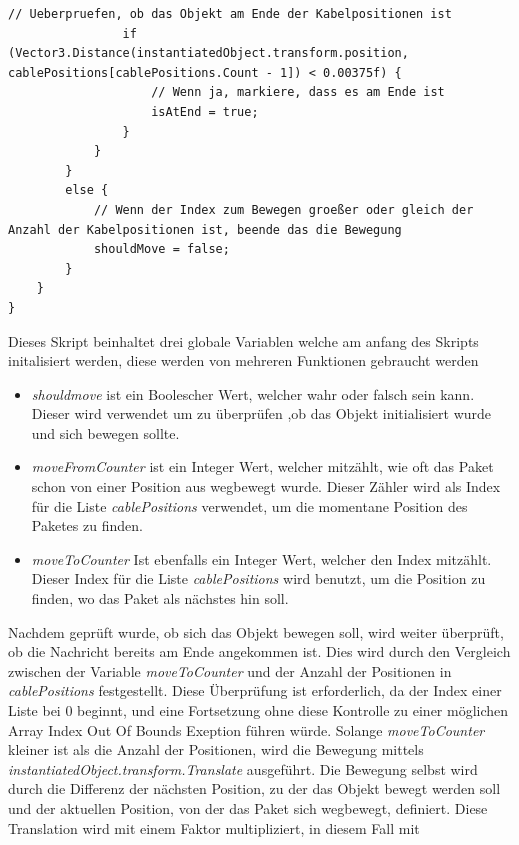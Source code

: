 \begin{itemize}
\begin{lstlisting}[style=csharp, caption={Update Funktion}, label=code:Update]
                // Ueberpruefen, ob das Objekt am Ende der Kabelpositionen ist
                if (Vector3.Distance(instantiatedObject.transform.position, cablePositions[cablePositions.Count - 1]) < 0.00375f) {
                    // Wenn ja, markiere, dass es am Ende ist
                    isAtEnd = true;
                }
            }
        }
        else {
            // Wenn der Index zum Bewegen groeßer oder gleich der Anzahl der Kabelpositionen ist, beende das die Bewegung
            shouldMove = false;
        }
    }
}

    \end{lstlisting}
    Dieses Skript beinhaltet drei globale Variablen welche am anfang des Skripts initalisiert werden, diese werden von mehreren Funktionen gebraucht werden
    \begin{itemize}
        \item \textit{shouldmove} ist ein Boolescher Wert, welcher wahr oder falsch sein kann. Dieser wird verwendet um zu überprüfen ,ob das Objekt initialisiert wurde und sich bewegen sollte.
        \item \textit{moveFromCounter} ist ein Integer Wert, welcher mitzählt, wie oft das Paket schon von einer Position aus wegbewegt wurde. Dieser Zähler wird als Index für die Liste \textit{cablePositions} verwendet, um die momentane Position des Paketes zu finden.
        \item \textit{moveToCounter} Ist ebenfalls ein Integer Wert, welcher den Index mitzählt. Dieser Index für die Liste \textit{cablePositions} wird benutzt, um die Position zu finden, wo das Paket als nächstes hin soll.
    \end{itemize}
    Nachdem geprüft wurde, ob sich das Objekt bewegen soll, wird weiter überprüft, ob die Nachricht bereits am Ende angekommen
    ist. Dies wird durch den Vergleich zwischen der Variable \textit{moveToCounter} und der Anzahl der Positionen in
    \textit{cablePositions} festgestellt. Diese Überprüfung ist erforderlich, da der Index einer Liste bei 0 beginnt,
    und eine Fortsetzung ohne diese Kontrolle zu einer möglichen Array Index Out Of Bounds Exeption führen würde. Solange
    \textit{moveToCounter} kleiner ist als die Anzahl der Positionen, wird die Bewegung mittels \textit{instantiatedObject.transform.Translate}
    ausgeführt. Die Bewegung selbst wird durch die Differenz der nächsten Position, zu der das Objekt bewegt werden soll und der aktuellen
    Position, von der das Paket sich wegbewegt, definiert. Diese Translation wird mit einem Faktor multipliziert, in diesem Fall mit

\end{itemize}
